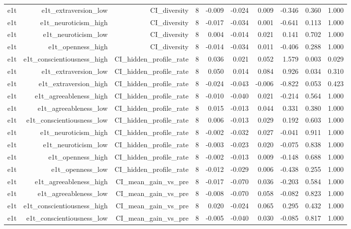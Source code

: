 \documentclass[11pt]{article}
\begin{document}
\begin{landscape}
\begin{longtable}{@{}lrrrrrrrrr@{}}
e1t & e1t\_extraversion\_low & CI\_diversity & 8 & -0.009 & -0.024 & 0.009 & -0.346 & 0.360 & 1.000 \\
e1t & e1t\_neuroticism\_high & CI\_diversity & 8 & -0.017 & -0.034 & 0.001 & -0.641 & 0.113 & 1.000 \\
e1t & e1t\_neuroticism\_low & CI\_diversity & 8 & 0.004 & -0.014 & 0.021 & 0.141 & 0.702 & 1.000 \\
e1t & e1t\_openness\_high & CI\_diversity & 8 & -0.014 & -0.034 & 0.011 & -0.406 & 0.288 & 1.000 \\
e1t & e1t\_conscientiousness\_high & CI\_hidden\_profile\_rate & 8 & 0.036 & 0.021 & 0.052 & 1.579 & 0.003 & 0.029 \\
e1t & e1t\_extraversion\_low & CI\_hidden\_profile\_rate & 8 & 0.050 & 0.014 & 0.084 & 0.926 & 0.034 & 0.310 \\
e1t & e1t\_extraversion\_high & CI\_hidden\_profile\_rate & 8 & -0.024 & -0.043 & -0.006 & -0.822 & 0.053 & 0.423 \\
e1t & e1t\_agreeableness\_high & CI\_hidden\_profile\_rate & 8 & -0.010 & -0.040 & 0.021 & -0.214 & 0.564 & 1.000 \\
e1t & e1t\_agreeableness\_low & CI\_hidden\_profile\_rate & 8 & 0.015 & -0.013 & 0.044 & 0.331 & 0.380 & 1.000 \\
e1t & e1t\_conscientiousness\_low & CI\_hidden\_profile\_rate & 8 & 0.006 & -0.013 & 0.029 & 0.192 & 0.603 & 1.000 \\
e1t & e1t\_neuroticism\_high & CI\_hidden\_profile\_rate & 8 & -0.002 & -0.032 & 0.027 & -0.041 & 0.911 & 1.000 \\
e1t & e1t\_neuroticism\_low & CI\_hidden\_profile\_rate & 8 & -0.003 & -0.023 & 0.020 & -0.075 & 0.838 & 1.000 \\
e1t & e1t\_openness\_high & CI\_hidden\_profile\_rate & 8 & -0.002 & -0.013 & 0.009 & -0.148 & 0.688 & 1.000 \\
e1t & e1t\_openness\_low & CI\_hidden\_profile\_rate & 8 & -0.012 & -0.029 & 0.006 & -0.438 & 0.255 & 1.000 \\
e1t & e1t\_agreeableness\_high & CI\_mean\_gain\_vs\_pre & 8 & -0.017 & -0.070 & 0.036 & -0.203 & 0.584 & 1.000 \\
e1t & e1t\_agreeableness\_low & CI\_mean\_gain\_vs\_pre & 8 & -0.008 & -0.070 & 0.058 & -0.082 & 0.823 & 1.000 \\
e1t & e1t\_conscientiousness\_high & CI\_mean\_gain\_vs\_pre & 8 & 0.020 & -0.024 & 0.065 & 0.295 & 0.432 & 1.000 \\
e1t & e1t\_conscientiousness\_low & CI\_mean\_gain\_vs\_pre & 8 & -0.005 & -0.040 & 0.030 & -0.085 & 0.817 & 1.000 \\

\end{longtable}
\end{landscape}
\end{document}
